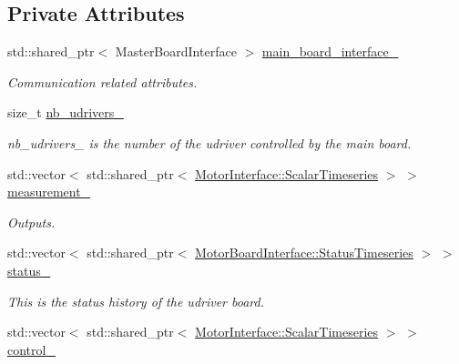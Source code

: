 \subsection*{Private Attributes}
\begin{DoxyCompactItemize}
\item 
std\+::shared\+\_\+ptr$<$ Master\+Board\+Interface $>$ \hyperlink{classblmc__drivers_1_1SpiBus_aa5505729650a363fc5ea2d03c27f0b90}{main\+\_\+board\+\_\+interface\+\_\+}
\begin{DoxyCompactList}\small\item\em Communication related attributes. \end{DoxyCompactList}\item 
\mbox{\label{classblmc__drivers_1_1SpiBus_ad6f453d80f7c40994d7c2d770e0bcb7a}} 
size\+\_\+t \hyperlink{classblmc__drivers_1_1SpiBus_ad6f453d80f7c40994d7c2d770e0bcb7a}{nb\+\_\+udrivers\+\_\+}
\begin{DoxyCompactList}\small\item\em nb\+\_\+udrivers\+\_\+ is the number of the udriver controlled by the main board. \end{DoxyCompactList}\item 
std\+::vector$<$ std\+::shared\+\_\+ptr$<$ \hyperlink{classblmc__drivers_1_1MotorInterface_a49b8fc916b9f9debbd7b0988463db5cd}{Motor\+Interface\+::\+Scalar\+Timeseries} $>$ $>$ \hyperlink{classblmc__drivers_1_1SpiBus_ae3ad20f9cd7e06585b3af84697870cfa}{measurement\+\_\+}
\begin{DoxyCompactList}\small\item\em Outputs. \end{DoxyCompactList}\item 
\mbox{\label{classblmc__drivers_1_1SpiBus_a6a39a07f72d977243eac5346ae4cabba}} 
std\+::vector$<$ std\+::shared\+\_\+ptr$<$ \hyperlink{classblmc__drivers_1_1MotorBoardInterface_ae3777e484dda60c4abe87f2b542ddfb8}{Motor\+Board\+Interface\+::\+Status\+Timeseries} $>$ $>$ \hyperlink{classblmc__drivers_1_1SpiBus_a6a39a07f72d977243eac5346ae4cabba}{status\+\_\+}
\begin{DoxyCompactList}\small\item\em This is the status history of the udriver board. \end{DoxyCompactList}\item 
std\+::vector$<$ std\+::shared\+\_\+ptr$<$ \hyperlink{classblmc__drivers_1_1MotorInterface_a49b8fc916b9f9debbd7b0988463db5cd}{Motor\+Interface\+::\+Scalar\+Timeseries} $>$ $>$ \hyperlink{classblmc__drivers_1_1SpiBus_a39d0629b2cb78b7aeae9a4022ca487ed}{control\+\_\+}

\end{DoxyCompactItemize}

